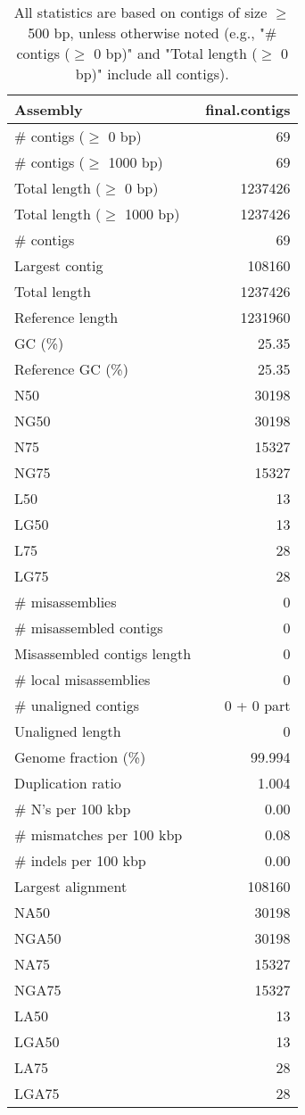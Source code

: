 \documentclass[12pt,a4paper]{article}
\begin{document}
\begin{table}[ht]
\begin{center}
\caption{All statistics are based on contigs of size $\geq$ 500 bp, unless otherwise noted (e.g., "\# contigs ($\geq$ 0 bp)" and "Total length ($\geq$ 0 bp)" include all contigs).}
\begin{tabular}{|l*{1}{|r}|}
\hline
Assembly & final.contigs \\ \hline
\# contigs ($\geq$ 0 bp) & 69 \\ \hline
\# contigs ($\geq$ 1000 bp) & 69 \\ \hline
Total length ($\geq$ 0 bp) & 1237426 \\ \hline
Total length ($\geq$ 1000 bp) & 1237426 \\ \hline
\# contigs & 69 \\ \hline
Largest contig & 108160 \\ \hline
Total length & 1237426 \\ \hline
Reference length & 1231960 \\ \hline
GC (\%) & 25.35 \\ \hline
Reference GC (\%) & 25.35 \\ \hline
N50 & 30198 \\ \hline
NG50 & 30198 \\ \hline
N75 & 15327 \\ \hline
NG75 & 15327 \\ \hline
L50 & 13 \\ \hline
LG50 & 13 \\ \hline
L75 & 28 \\ \hline
LG75 & 28 \\ \hline
\# misassemblies & 0 \\ \hline
\# misassembled contigs & 0 \\ \hline
Misassembled contigs length & 0 \\ \hline
\# local misassemblies & 0 \\ \hline
\# unaligned contigs & 0 + 0 part \\ \hline
Unaligned length & 0 \\ \hline
Genome fraction (\%) & 99.994 \\ \hline
Duplication ratio & 1.004 \\ \hline
\# N's per 100 kbp & 0.00 \\ \hline
\# mismatches per 100 kbp & 0.08 \\ \hline
\# indels per 100 kbp & 0.00 \\ \hline
Largest alignment & 108160 \\ \hline
NA50 & 30198 \\ \hline
NGA50 & 30198 \\ \hline
NA75 & 15327 \\ \hline
NGA75 & 15327 \\ \hline
LA50 & 13 \\ \hline
LGA50 & 13 \\ \hline
LA75 & 28 \\ \hline
LGA75 & 28 \\ \hline
\end{tabular}
\end{center}
\end{table}
\end{document}
